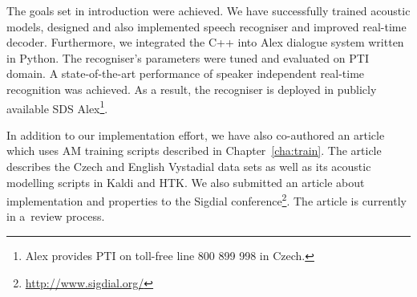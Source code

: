 % 
% 
% 

The goals set in introduction were achieved. 
We have successfully trained acoustic models, designed and also implemented speech recogniser and improved real-time decoder. 
Furthermore, we integrated the C++  into Alex dialogue system written in Python.
The recogniser's parameters were tuned and evaluated on \ac{PTI} domain.
A state-of-the-art performance of speaker independent real-time recognition was achieved. 
As a result, the recogniser is deployed in publicly available \acl{SDS} Alex\footnote{Alex provides \acl{PTI} on toll-free line 800 899 998 in Czech.}.

In addition to our implementation effort, we have also co-authored an article which uses \ac{AM} training scripts described in Chapter~\ref{cha:train}.
The article\cite{korvas_2014} describes the Czech and English Vystadial data sets as well as its acoustic modelling scripts in Kaldi and \ac{HTK}.
We also submitted an article about  implementation and properties to the Sigdial conference\footnote{\url{http://www.sigdial.org/}}. The article is currently in a~review process.

